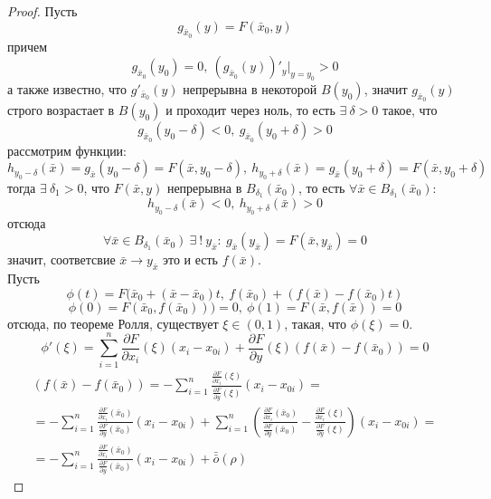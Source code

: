 \begin{proof}
    Пусть 
    \[g_{\bar{x}_0}(y)=F(\bar{x}_0,y)\]
    причем
    \[g_{\bar{x}_0}(y_0)=0,\ (g_{\bar{x}_0}(y))'_y|_{y=y_0}>0\]
    а также известно, что $g'_{\bar{x}_0}(y)$ непрерывна в некоторой $B(y_0)$, значит $g_{\bar{x}_0}(y)$ строго возрастает в $B(y_0)$ и проходит через ноль, то есть $\exists\ \delta>0$ такое, что
    \[g_{\bar{x}_0}(y_0-\delta)<0,\ g_{\bar{x}_0}(y_0+\delta)>0\]
    рассмотрим функции:
    \[h_{y_0-\delta}(\bar{x})=g_{\bar{x}}(y_0-\delta)=F(\bar{x},y_0-\delta),\ h_{y_0+\delta}(\bar{x})=g_{\bar{x}}(y_0+\delta)=F(\bar{x}, y_0+\delta)\] 
    тогда $\exists\ \delta_1>0$, что $F(\bar{x}, y)$ непрерывна в $B_{\delta_1}(\bar{x}_0)$, то есть $\forall \bar{x}\in B_{\delta_1}(\bar{x}_0)$:
    \[h_{y_0-\delta}(\bar{x})<0,\ h_{y_0+\delta}(\bar{x})>0\]
    отсюда
    \[\forall \bar{x}\in B_{\delta_1}(\bar{x}_0)\ \exists\ !\ y_{\bar{x}}:\ g_{\bar{x}}(y_{\bar{x}})=F(\bar{x},y_{\bar{x}})=0\]
    значит, соответсвие $\bar{x}\to y_{\bar{x}}$ это и есть $f(\bar{x})$.\\
    Пусть 
    \[\phi(t)=F(\bar{x}_0+(\bar{x}-\bar{x}_0)t,\ f(\bar{x}_0)+(f(\bar{x})-f(\bar{x}_0)t)\]
    \[\phi(0)=F(\bar{x}_0, f(\bar{x}_0)))=0,\ \phi(1)=F(\bar{x}, f(\bar{x}))=0\]
    отсюда, по теореме Ролля, существует $\xi\in (0,1)$, такая, что $\phi(\xi)=0$.
    \[\phi'(\xi)=\sum\limits_{i=1}^{n}\frac{\partial {F}}{\partial {x_i}}(\xi)(x_i-x_{0i})+\frac{\partial {F}}{\partial {y}}(\xi)(f(\bar{x})-f(\bar{x}_0))=0\]
    \begin{multline*}
        (f(\bar{x})-f(\bar{x}_0))=-\sum\limits_{i=1}^{n}\frac{\frac{\partial {F}}{\partial {x_i}}(\xi)}{\frac{\partial {F}}{\partial {y}}(\xi)}(x_i-x_{0i})=\\
        =-\sum\limits_{i=1}^{n}\frac{\frac{\partial {F}}{\partial {x_i}}(\bar{x}_0)}{\frac{\partial {F}}{\partial {y}}(\bar{x}_0)}(x_i-x_{0i})+\sum\limits_{i=1}^{n}\left(\frac{\frac{\partial {F}}{\partial {x_i}}(\bar{x}_0)}{\frac{\partial {F}}{\partial {y}}(\bar{x}_0)}-\frac{\frac{\partial {F}}{\partial {x_i}}(\xi)}{\frac{\partial {F}}{\partial {y}}(\xi)}\right)(x_i-x_{0i})=\\
        =-\sum\limits_{i=1}^{n}\frac{\frac{\partial {F}}{\partial {x_i}}(\bar{x}_0)}{\frac{\partial {F}}{\partial {y}}(\bar{x}_0)}(x_i-x_{0i})+\bar{\bar{o}}{(\rho)}
    \end{multline*} 
\end{proof} 
